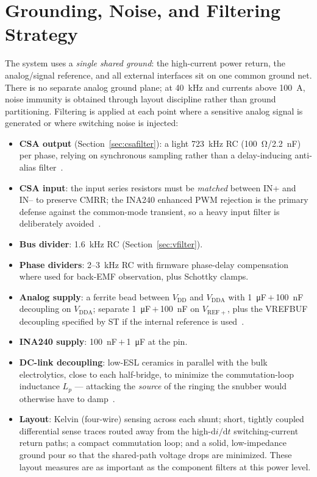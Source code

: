 \documentclass[journal,onecolumn,11pt]{IEEEtran}
\begin{document}
\section{Grounding, Noise, and Filtering Strategy}\label{sec:noise}

The system uses a \emph{single shared ground}: the high-current power return, the analog/signal
reference, and all external interfaces sit on one common ground net. There is no separate analog
ground plane; at \SI{40}{\kilo\hertz} and currents above \SI{100}{\ampere}, noise immunity is
obtained through layout discipline rather than ground partitioning. Filtering is applied at each
point where a sensitive analog signal is generated or where switching noise is injected:
\begin{itemize}[leftmargin=1.3em]
\item \textbf{CSA output} (Section~\ref{sec:csafilter}): a light \SI{723}{\kilo\hertz} RC
      (\SI{100}{\ohm}/\SI{2.2}{\nano\farad}) per phase, relying on synchronous sampling rather than a
      delay-inducing anti-alias filter~\cite{an5346}.
\item \textbf{CSA input}: the input series resistors must be \emph{matched} between IN+ and IN-- to
      preserve CMRR; the INA240 enhanced PWM rejection is the primary defense against the common-mode
      transient, so a heavy input filter is deliberately avoided~\cite{ina240ds}.
\item \textbf{Bus divider}: \SI{1.6}{\kilo\hertz} RC (Section~\ref{sec:vfilter}).
\item \textbf{Phase dividers}: 2--\SI{3}{\kilo\hertz} RC with firmware phase-delay compensation where
      used for back-EMF observation, plus Schottky clamps.
\item \textbf{Analog supply}: a ferrite bead between $V_{\mathrm{DD}}$ and $V_{\mathrm{DDA}}$ with
      \SI{1}{\micro\farad}\,$+$\,\SI{100}{\nano\farad} decoupling on $V_{\mathrm{DDA}}$; separate
      \SI{1}{\micro\farad}\,$+$\,\SI{100}{\nano\farad} on $V_{\mathrm{REF+}}$, plus the VREFBUF
      decoupling specified by ST if the internal reference is used~\cite{stm32g473ds}.
\item \textbf{INA240 supply}: \SI{100}{\nano\farad}\,$+$\,\SI{1}{\micro\farad} at the pin.
\item \textbf{DC-link decoupling}: low-ESL ceramics in parallel with the bulk electrolytics, close to
      each half-bridge, to minimize the commutation-loop inductance $L_p$ --- attacking the
      \emph{source} of the ringing the snubber would otherwise have to damp~\cite{severns}.
\item \textbf{Layout}: Kelvin (four-wire) sensing across each shunt; short, tightly coupled
      differential sense traces routed away from the high-$\mathrm{d}i/\mathrm{d}t$ switching-current
      return paths; a compact commutation loop; and a solid, low-impedance ground pour so that the
      shared-path voltage drops are minimized. These layout measures are as important as the
      component filters at this power level.
\end{itemize}
\end{document}
